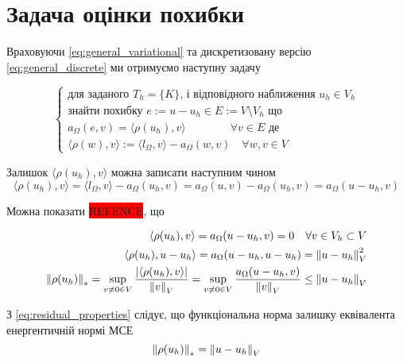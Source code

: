
\section{Задача оцінки похибки}

Враховуючи \ref{eq:general_variational} та дискретизовану версію \ref{eq:general_discrete} ми отримуємо наступну задачу

\begin{equation}\label{eq:AE_problem}
	\begin{cases}
		\mbox{для заданого } T_h=\{K\} \text{, і відповідного наближення } u_h \in V_h \\
		\text{знайти похибку } e:=u-u_h \in E := V \setminus V_h \text{ що} \\
		a_\Omega(e,v) = \langle\rho(u_h), v\rangle \qquad \qquad \forall v \in E \text{ де}\\
		\langle\rho(w), v\rangle := \langle l_\Omega, v\rangle - a_\Omega(w, v) \quad \forall w,v \in V
	\end{cases}
\end{equation}

Залишок $\langle\rho(u_h), v\rangle$ можна записати наступним чином
\begin{equation*}
	\langle\rho(u_h), v\rangle
		= \langle l_\Omega, v\rangle - a_\Omega(u_h, v)
		= a_\Omega(u,v)-a_\Omega(u_h, v) = a_\Omega(u-u_h, v)
\end{equation*}

Можна показати \colorbox{red}{REFENCE}, що

\begin{equation}\label{eq:residual_properties}
	\begin{split}
		\langle\rho(u_h), v\rangle = a_\Omega(u-u_h, v) = 0 \quad \forall v \in V_h \subset V \\
		\langle\rho(u_h), u-u_h\rangle = a_\Omega(u-u_h, u-u_h) = \left\lVert u-u_h\right\rVert^2_V \\
		\left\lVert\rho(u_h)\right\rVert_* = \sup \limits_{v \ne 0 \in V} \frac{|\langle\rho(u_h), v\rangle|}{\left\lVert v\right\rVert_V} =
			\sup \limits_{v \ne 0 \in V} \frac{a_\Omega(u-u_h, v)}{\left\lVert v\right\rVert_V} \le \left\lVert u-u_h\right\rVert_V
	\end{split}
\end{equation}

З \ref{eq:residual_properties} слідує, що функціональна норма залишку еквівалента енергентичній нормі МСЕ
\begin{equation}
	\left\lVert\rho(u_h)\right\rVert_* = \left\lVert u-u_h\right\rVert_V
\end{equation}


